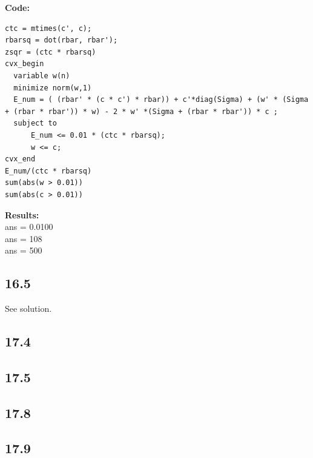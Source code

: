 \documentclass[12pt]{article}
\begin{document}
\textbf{Code:}\\
\begin{lstlisting}
ctc = mtimes(c', c);
rbarsq = dot(rbar, rbar');
zsqr = (ctc * rbarsq)
cvx_begin
  variable w(n)
  minimize norm(w,1)
  E_num = ( (rbar' * (c * c') * rbar)) + c'*diag(Sigma) + (w' * (Sigma + (rbar * rbar')) * w) - 2 * w' *(Sigma + (rbar * rbar')) * c ;
  subject to
      E_num <= 0.01 * (ctc * rbarsq);
      w <= c;
cvx_end
E_num/(ctc * rbarsq)
sum(abs(w > 0.01))
sum(abs(c > 0.01))
\end{lstlisting}
\textbf{Results:}\\
ans = 0.0100\\
ans = 108\\
ans = 500\\

\subsection*{16.5}
See solution.

\subsection*{17.4}
\subsection*{17.5}
\subsection*{17.8}
\subsection*{17.9}
 
\end{document}
